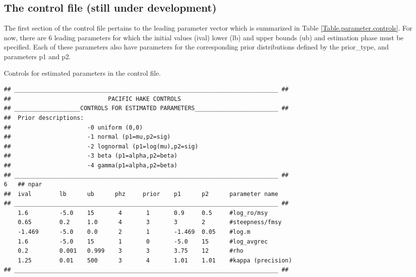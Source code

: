 \begin{multicols}{2}
\subsection{The control file (still under development)}
The first section of the control file pertains to the leading parameter vector which is summarized in Table \ref{Table.parameter.controls}.  For now, there are 6 leading parameters for which the initial values (ival) lower (lb) and upper bounds (ub) and estimation phase must be specified.  Each of these parameters also have parameters for the corresponding prior distributions defined by the prior\_type, and parameters p1 and p2.

\begin{tablehere}\caption{Controls for estimated parameters in the control file.}\label{Table.parameter.controls}
\begin{tiny}
\begin{verbatim}
## ____________________________________________________________________________ ##
##                            PACIFIC HAKE CONTROLS
## ___________________CONTROLS FOR ESTIMATED PARAMETERS________________________ ##
##  Prior descriptions:
##                      -0 uniform (0,0)
##                      -1 normal (p1=mu,p2=sig)
##                      -2 lognormal (p1=log(mu),p2=sig)
##                      -3 beta (p1=alpha,p2=beta)
##                      -4 gamma(p1=alpha,p2=beta)
## ____________________________________________________________________________ ##
6   ## npar
##  ival        lb      ub      phz     prior    p1      p2      parameter name
## ____________________________________________________________________________ ##
    1.6         -5.0    15       4       1       0.9     0.5     #log_ro/msy 
    0.65        0.2     1.0      4       3       3       2       #steepness/fmsy
    -1.469      -5.0    0.0      2       1       -1.469  0.05    #log.m
    1.6         -5.0    15       1       0       -5.0    15      #log_avgrec
    0.2         0.001   0.999    3       3       3.75    12      #rho
    1.25        0.01    500      3       4       1.01    1.01    #kappa (precision)
## ____________________________________________________________________________ ##
\end{verbatim}
\end{tiny}
\end{tablehere}
%	

\end{multicols}
